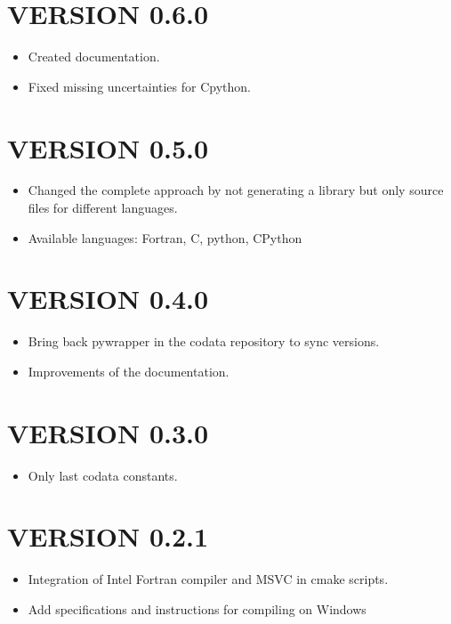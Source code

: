 \section*{VERSION 0.6.0}
\begin{itemize}
\item Created documentation.
\item Fixed missing uncertainties for Cpython.
\end{itemize}



\section*{VERSION 0.5.0}
\begin{itemize}
\item Changed the complete approach by not generating a library but only source files for different languages.
\item Available languages: Fortran, C, python, CPython
\end{itemize}



\section*{VERSION 0.4.0}
\begin{itemize}
\item Bring back pywrapper in the codata repository to sync versions.
\item Improvements of the documentation.
\end{itemize}



\section*{VERSION 0.3.0}
\begin{itemize}
\item Only last codata constants.
\end{itemize}


\section*{VERSION 0.2.1}
\begin{itemize}
\item Integration of Intel Fortran compiler and MSVC in cmake scripts.
\item Add specifications and instructions for compiling on Windows
\end{itemize}



